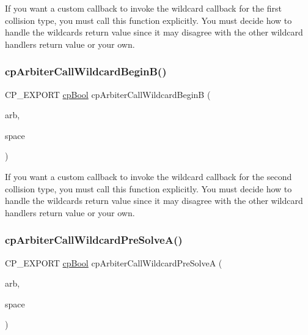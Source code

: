 If you want a custom callback to invoke the wildcard callback for the first collision type, you must call this function explicitly. You must decide how to handle the wildcard\textquotesingle{}s return value since it may disagree with the other wildcard handler\textquotesingle{}s return value or your own. \mbox{\label{group__cp_arbiter_ga7a0a1ad2040728e877d72ff16868fcef}} 
\subsubsection{\texorpdfstring{cp\+Arbiter\+Call\+Wildcard\+Begin\+B()}{cpArbiterCallWildcardBeginB()}}
{\footnotesize\ttfamily C\+P\+\_\+\+E\+X\+P\+O\+RT \mbox{\hyperlink{group__basic_types_gabc5e752c48f3449ca26ef413ecbd647e}{cp\+Bool}} cp\+Arbiter\+Call\+Wildcard\+BeginB (\begin{DoxyParamCaption}\item[{\mbox{\hyperlink{structcp_arbiter}{cp\+Arbiter}} $\ast$}]{arb,  }\item[{\mbox{\hyperlink{structcp_space}{cp\+Space}} $\ast$}]{space }\end{DoxyParamCaption})}

If you want a custom callback to invoke the wildcard callback for the second collision type, you must call this function explicitly. You must decide how to handle the wildcard\textquotesingle{}s return value since it may disagree with the other wildcard handler\textquotesingle{}s return value or your own. \mbox{\label{group__cp_arbiter_ga3e69fd89f304026f6f5248bc49fd6bba}} 
\subsubsection{\texorpdfstring{cp\+Arbiter\+Call\+Wildcard\+Pre\+Solve\+A()}{cpArbiterCallWildcardPreSolveA()}}
{\footnotesize\ttfamily C\+P\+\_\+\+E\+X\+P\+O\+RT \mbox{\hyperlink{group__basic_types_gabc5e752c48f3449ca26ef413ecbd647e}{cp\+Bool}} cp\+Arbiter\+Call\+Wildcard\+Pre\+SolveA (\begin{DoxyParamCaption}\item[{\mbox{\hyperlink{structcp_arbiter}{cp\+Arbiter}} $\ast$}]{arb,  }\item[{\mbox{\hyperlink{structcp_space}{cp\+Space}} $\ast$}]{space }\end{DoxyParamCaption})}

